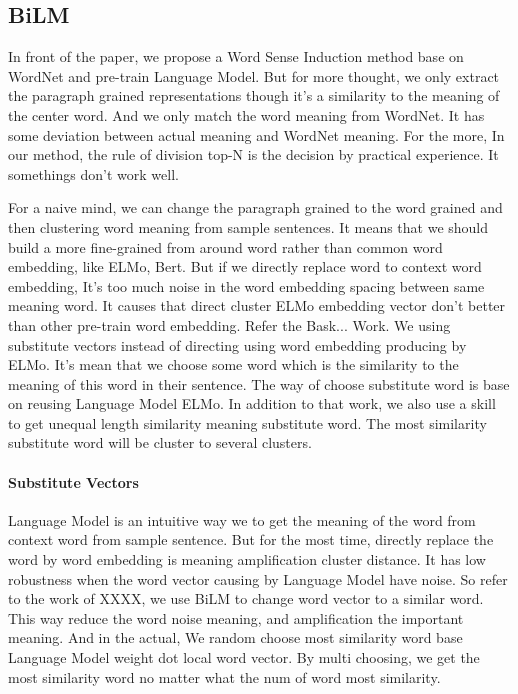 \subsection{BiLM}
\label{sec:bilm}

In front of the paper, we propose a Word Sense Induction method base on WordNet and pre-train Language Model.
But for more thought, we only extract the paragraph grained representations though it's a similarity to the meaning of the center word.
And we only match the word meaning from WordNet. It has some deviation between actual meaning and WordNet meaning.
For the more, In our method, the rule of division top-N is the decision by practical experience. It somethings don't work well.

For a naive mind, we can change the paragraph grained to the word grained and then clustering word meaning from sample sentences.
It means that we should build a more fine-grained from around word rather than common word embedding, like ELMo, Bert.
But if we directly replace word to context word embedding, It's too much noise in the word embedding spacing between same meaning word.
It causes that direct cluster ELMo embedding vector don't better than other pre-train word embedding.
Refer the Bask... Work. We using substitute vectors instead of directing using word embedding producing by ELMo.
It's mean that we choose some word which is the similarity to the meaning of this word in their sentence.
The way of choose substitute word is base on reusing Language Model ELMo.
In addition to that work, we also use a skill to get unequal length similarity meaning substitute word.
The most similarity substitute word will be cluster to several clusters. 

\paragraph{Substitute Vectors}
Language Model is an intuitive way we to get the meaning of the word from context word from sample sentence.
But for the most time, directly replace the word by word embedding is meaning amplification cluster distance.
It has low robustness when the word vector causing by Language Model have noise.
So refer to the work of XXXX, we use BiLM to change word vector to a similar word.
This way reduce the word noise meaning, and amplification the important meaning.
And in the actual, We random choose most similarity word base Language Model weight dot local word vector.
By multi choosing, we get the most similarity word no matter what the num of word most similarity.

